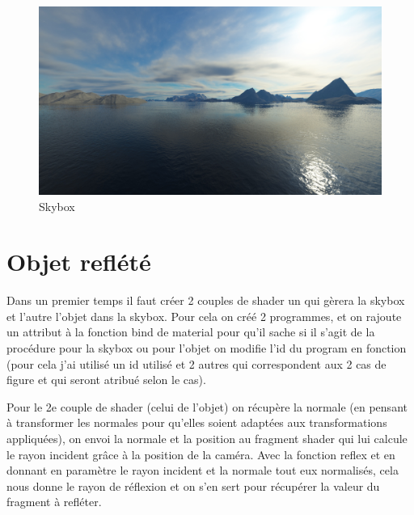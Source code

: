 \documentclass{article}
\begin{document}
\begin{figure}[h]
    \center
    \includegraphics[scale=0.25]{skybox.png}
    \caption{Skybox}
\end{figure}

\section{Objet reflété}
Dans un premier temps il faut créer 2 couples de shader un qui gèrera la skybox et l'autre l'objet dans la skybox.
Pour cela on créé 2 programmes, et on rajoute un attribut à la fonction bind de material pour qu'il sache si il s'agit de la procédure pour la skybox ou pour l'objet on modifie l'id du program en fonction (pour cela j'ai utilisé un id utilisé et 2 autres qui correspondent aux 2 cas de figure et qui seront atribué selon le cas).

Pour le 2e couple de shader (celui de l'objet) on récupère la normale (en pensant à transformer les normales pour qu'elles soient adaptées aux transformations appliquées), on envoi la normale et la position au fragment shader qui lui calcule le rayon incident grâce à la position de la caméra. Avec la fonction reflex et en donnant en paramètre le rayon incident et la normale tout eux normalisés, cela nous donne le rayon de réflexion et on s'en sert pour récupérer la valeur du fragment à refléter.
\end{document}
